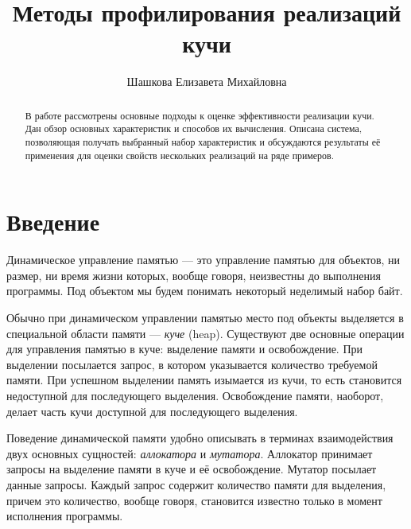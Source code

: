 \title{Методы профилирования реализаций кучи}
%
\author{Шашкова Елизавета Михайловна}
%
%
%

\maketitle              %

\begin{abstract}
В работе рассмотрены основные подходы к оценке эффективности реализации
кучи. Дан обзор основных характеристик и способов их вычисления. Описана
система, позволяющая получать выбранный набор характеристик и обсуждаются 
результаты её применения для оценки свойств нескольких реализаций на 
ряде примеров.
\end{abstract}
%

\section*{Введение}
Динамическое управление памятью --- это управление памятью для объектов, ни размер, ни время жизни которых, вообще говоря, неизвестны до
выполнения программы. Под объектом мы будем понимать некоторый неделимый набор байт.
   
Обычно при динамическом управлении памятью место под объекты выделяется в специальной области памяти --- \emph{куче} (heap). 
Существуют две основные операции для управления памятью в куче: выделение памяти и освобождение. При выделении 
посылается запрос, в котором указывается количество требуемой памяти. При успешном выделении память изымается из кучи, 
то есть становится недоступной для последующего выделения. Освобождение памяти, наоборот, делает часть кучи доступной для 
последующего выделения.
   
Поведение динамической памяти удобно описывать в терминах взаимодействия двух основных сущностей: \emph{аллокатора} и 
\emph{мутатора}. Аллокатор принимает запросы на выделение памяти в куче и её освобождение. Мутатор посылает данные запросы. 
Каждый запрос содержит количество памяти для выделения, причем это количество, вообще говоря, становится известно 
только в момент исполнения программы.
   
